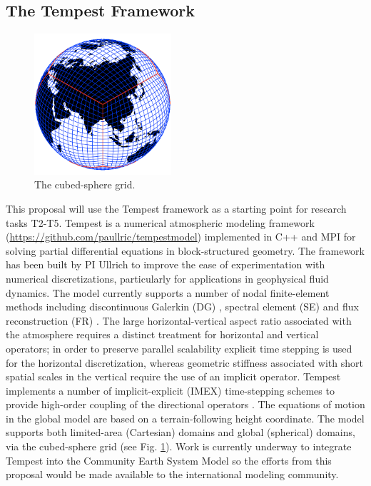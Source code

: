 \documentclass[11pt]{article}
\begin{document}
\subsection{The Tempest Framework} \label{sec:TempestFramework}

\begin{figure}
\begin{center}
\includegraphics[width=2in]{A_CubedSphere}
\end{center}
\caption{The cubed-sphere grid.} \label{fig:CubedSphere}
\end{figure}

This proposal will use the Tempest framework as a starting point for research tasks T2-T5.  Tempest is a numerical atmospheric modeling framework (\url{https://github.com/paullric/tempestmodel}) \citep{PAU2014GMDa, PAU2014GMDb} implemented in C++ and MPI for solving partial differential equations in block-structured geometry.  The framework has been built by PI Ullrich to improve the ease of experimentation with numerical discretizations, particularly for applications in geophysical fluid dynamics.  The model currently supports a number of nodal finite-element methods including discontinuous Galerkin (DG) \cite{}, spectral element (SE) \cite{} and flux reconstruction (FR) \cite{}.  The large horizontal-vertical aspect ratio associated with the atmosphere requires a distinct treatment for horizontal and vertical operators; in order to preserve parallel scalability explicit time stepping is used for the horizontal discretization, whereas geometric stiffness associated with short spatial scales in the vertical require the use of an implicit operator.  Tempest implements a number of implicit-explicit (IMEX) time-stepping schemes to provide high-order coupling of the directional operators \citep{PAUCJ2012MWR}.  The equations of motion in the global model are based on a terrain-following height coordinate.  The model supports both limited-area (Cartesian) domains and global (spherical) domains, via the cubed-sphere grid (see Fig. \ref{fig:CubedSphere}).  Work is currently underway to integrate Tempest into the Community Earth System Model \citep{JWHetal2013BAMS} so the efforts from this proposal would be made available to the international modeling community.
\end{document}
